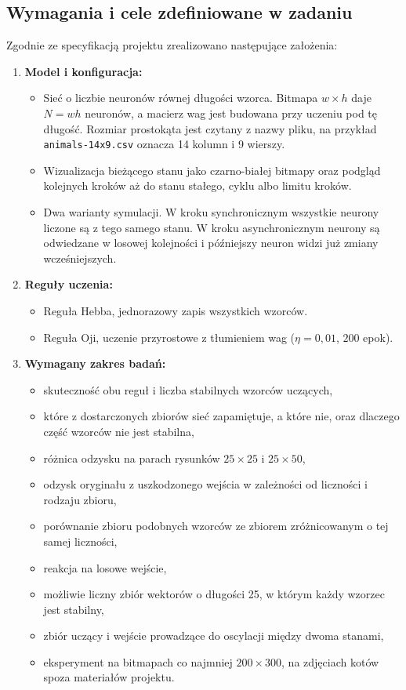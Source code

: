 \documentclass[11pt,a4paper]{article}
\begin{document}
\subsection{Wymagania i cele zdefiniowane w zadaniu}
Zgodnie ze specyfikacją projektu zrealizowano następujące założenia:
\begin{enumerate}
    \item \textbf{Model i konfiguracja:}
    \begin{itemize}
        \item Sieć o liczbie neuronów równej długości wzorca. Bitmapa \(w \times h\) daje \(N = wh\) neuronów, a macierz wag jest budowana przy uczeniu pod tę długość. Rozmiar prostokąta jest czytany z nazwy pliku, na przykład \texttt{animals-14x9.csv} oznacza 14 kolumn i 9 wierszy.
        \item Wizualizacja bieżącego stanu jako czarno-białej bitmapy oraz podgląd kolejnych kroków aż do stanu stałego, cyklu albo limitu kroków.
        \item Dwa warianty symulacji. W kroku synchronicznym wszystkie neurony liczone są z tego samego stanu. W kroku asynchronicznym neurony są odwiedzane w losowej kolejności i późniejszy neuron widzi już zmiany wcześniejszych.
    \end{itemize}

    \item \textbf{Reguły uczenia:}
    \begin{itemize}
        \item Reguła Hebba, jednorazowy zapis wszystkich wzorców.
        \item Reguła Oji, uczenie przyrostowe z tłumieniem wag (\(\eta = 0{,}01\), \(200\) epok).
    \end{itemize}

    \item \textbf{Wymagany zakres badań:}
    \begin{itemize}
        \item skuteczność obu reguł i liczba stabilnych wzorców uczących,
        \item które z dostarczonych zbiorów sieć zapamiętuje, a które nie, oraz dlaczego część wzorców nie jest stabilna,
        \item różnica odzysku na parach rysunków \(25\times 25\) i \(25\times 50\),
        \item odzysk oryginału z uszkodzonego wejścia w zależności od liczności i rodzaju zbioru,
        \item porównanie zbioru podobnych wzorców ze zbiorem zróżnicowanym o tej samej liczności,
        \item reakcja na losowe wejście,
        \item możliwie liczny zbiór wektorów o długości 25, w którym każdy wzorzec jest stabilny,
        \item zbiór uczący i wejście prowadzące do oscylacji między dwoma stanami,
        \item eksperyment na bitmapach co najmniej \(200\times 300\), na zdjęciach kotów spoza materiałów projektu.
    \end{itemize}
\end{enumerate}
\end{document}
